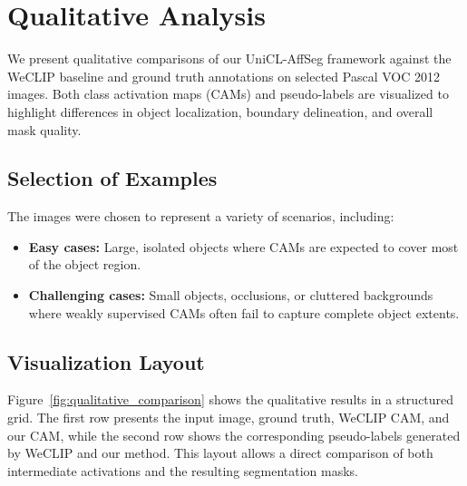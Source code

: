 \section{Qualitative Analysis}
\label{sec:qualitative_analysis}

We present qualitative comparisons of our UniCL-AffSeg framework against the WeCLIP baseline and ground truth annotations on selected Pascal VOC 2012 images. Both class activation maps (CAMs) and pseudo-labels are visualized to highlight differences in object localization, boundary delineation, and overall mask quality.

\subsection{Selection of Examples}
The images were chosen to represent a variety of scenarios, including: 
\begin{itemize}
    \item \textbf{Easy cases:} Large, isolated objects where CAMs are expected to cover most of the object region.
    \item \textbf{Challenging cases:} Small objects, occlusions, or cluttered backgrounds where weakly supervised CAMs often fail to capture complete object extents.
\end{itemize}

\subsection{Visualization Layout}
Figure~\ref{fig:qualitative_comparison} shows the qualitative results in a structured grid. 
The first row presents the input image, ground truth, WeCLIP CAM, and our CAM, while the second row shows the corresponding pseudo-labels generated by WeCLIP and our method. This layout allows a direct comparison of both intermediate activations and the resulting segmentation masks.


